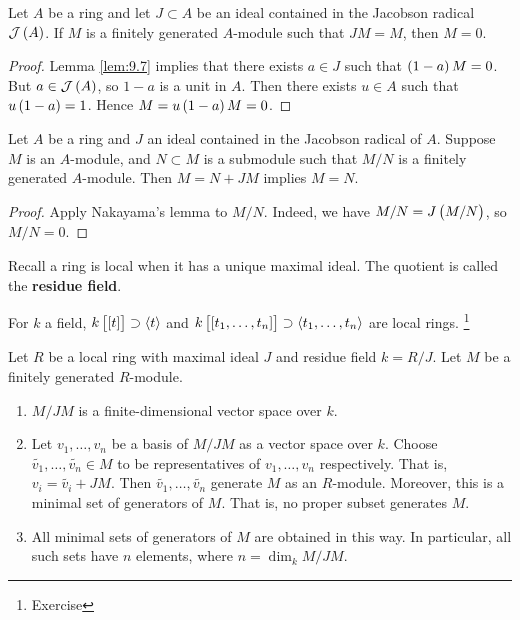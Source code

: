 \begin{theorem}
Let $ A $ be a ring and let $ J \subset A $ be an ideal contained in the Jacobson radical $ \JJJ\br{A} $. If $ M $ is a finitely generated $ A $-module such that $ JM = M $, then $ M = 0 $.
\end{theorem}

\begin{proof}
Lemma \ref{lem:9.7} implies that there exists $ a \in J $ such that $ \br{1 - a}M = 0 $. But $ a \in \JJJ\br{A} $, so $ 1 - a $ is a unit in $ A $. Then there exists $ u \in A $ such that $ u\br{1 - a} = 1 $. Hence $ M = u\br{1 - a}M = 0 $.
\end{proof}

\begin{corollary}
\label{cor:9.10}
Let $ A $ be a ring and $ J $ an ideal contained in the Jacobson radical of $ A $. Suppose $ M $ is an $ A $-module, and $ N \subset M $ is a submodule such that $ M / N $ is a finitely generated $ A $-module. Then $ M = N + JM $ implies $ M = N $.
\end{corollary}

\begin{proof}
Apply Nakayama's lemma to $ M / N $. Indeed, we have $ M / N = J\br{M / N} $, so $ M / N = 0 $.
\end{proof}

\pagebreak

Recall a ring is local when it has a unique maximal ideal. The quotient is called the \textbf{residue field}.

\begin{example*}
For $ k $ a field, $ k\sbr{\sbr{t}} \supset \abr{t} $ and $ k\sbr{\sbr{t_1, \dots, t_n}} \supset \abr{t_1, \dots, t_n} $ are local rings. \footnote{Exercise}
\end{example*}

\begin{theorem}
\label{thm:9.11}
Let $ R $ be a local ring with maximal ideal $ J $ and residue field $ k = R / J $. Let $ M $ be a finitely generated $ R $-module.
\begin{enumerate}
\item $ M / JM $ is a finite-dimensional vector space over $ k $.
\item Let $ v_1, \dots, v_n $ be a basis of $ M / JM $ as a vector space over $ k $. Choose $ \widetilde{v_1}, \dots, \widetilde{v_n} \in M $ to be representatives of $ v_1, \dots, v_n $ respectively. That is, $ v_i = \widetilde{v_i} + JM $. Then $ \widetilde{v_1}, \dots, \widetilde{v_n} $ generate $ M $ as an $ R $-module. Moreover, this is a minimal set of generators of $ M $. That is, no proper subset generates $ M $.
\item All minimal sets of generators of $ M $ are obtained in this way. In particular, all such sets have $ n $ elements, where $ n = \dim_k M / JM $.
\end{enumerate}
\end{theorem}

